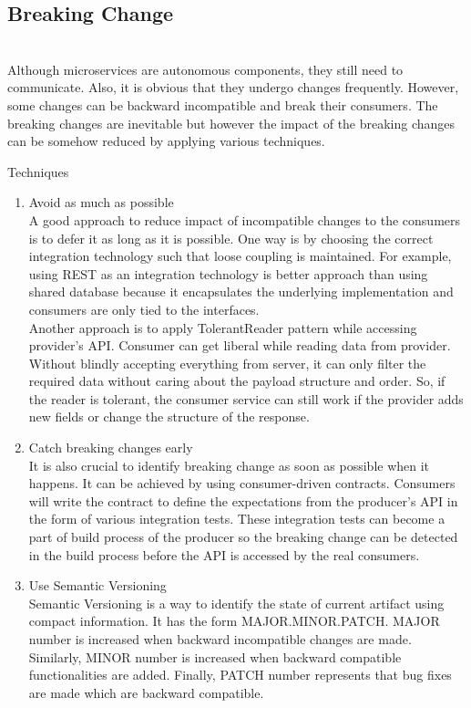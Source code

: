\subsection{Breaking Change}\label{section:challanges_of_microservices_architecture/integration/breaking_change}
\\
Although microservices are autonomous components, they still need to communicate. Also, it is obvious that they undergo changes frequently. However, some changes can be backward incompatible and break their consumers. The breaking changes are inevitable but however the impact of the breaking changes can be somehow reduced by applying various techniques. \cite{Newman:2015aa}
\begin{shaded}Techniques\end{shaded}
\begin{enumerate}
\item Avoid as much as possible \\ A good approach to reduce impact of incompatible changes to the consumers is to defer it as long as it is possible. One way is by choosing the correct integration technology such that loose coupling is maintained. For example, using \acrshort{REST} as an integration technology is better approach than using shared database because it encapsulates the underlying implementation and consumers are only tied to the interfaces.\\
Another approach is to apply TolerantReader pattern while accessing provider's \acrshort{API}. \cite{Fowler:2011aa} Consumer can get liberal while reading data from provider. Without blindly accepting everything from server, it can only filter the required data without caring about the payload structure and order. So, if the reader is tolerant, the consumer service can still work if the provider adds new fields or change the structure of the response.
\item Catch breaking changes early \\ It is also crucial to identify breaking change as soon as  possible when it happens. It can be achieved by using consumer-driven contracts. Consumers will write the contract to define the expectations from the producer's \acrshort{API} in the form of various integration tests. These integration tests can become a part of build process of the producer so the breaking change can be detected in the build process before the \acrshort{API} is accessed by the real consumers.
\item Use Semantic Versioning \\ Semantic Versioning is a way to identify the state of current artifact using compact information. It has the form MAJOR.MINOR.PATCH. MAJOR number is increased when backward incompatible changes are made. Similarly, MINOR number is increased when backward compatible functionalities are added. Finally, PATCH number represents that bug fixes are made which are backward compatible.\\

\end{enumerate}
